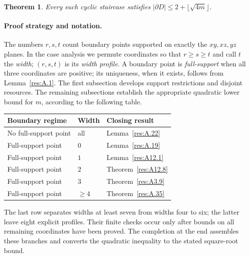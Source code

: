 \documentclass[11pt]{article}
\newtheorem{theorem}{Theorem}[section]
\theoremstyle{definition}
\theoremstyle{remark}
\theoremstyle{plain}
\begin{document}
\begin{theorem}\label{thm:capacity}
Every such cyclic staircase satisfies
$|\partial D|\le2+\lfloor\sqrt{4m}\rfloor$.
\end{theorem}


\paragraph{Proof strategy and notation.}
The numbers $r,s,t$ count boundary points supported on exactly the
$xy,xz,yz$ planes. In the case analysis we permute coordinates so that
$r\ge s\ge t$ and call $t$ the \emph{width}; $(r,s,t)$ is its
\emph{width profile}. A boundary point is
\emph{full-support} when all three coordinates are positive; its
uniqueness, when it exists, follows from Lemma~\ref{res:A.1}.
The first subsection develops support restrictions and disjoint
resources. The remaining subsections establish the appropriate quadratic
lower bound for $m$, according to the following table.
\begin{center}
\begin{tabular}{@{}lll@{}}\toprule
Boundary regime&Width&Closing result\\\midrule
No full-support point&all&Lemma~\ref{res:A.22}\\
Full-support point&$0$&Lemma~\ref{res:A.19}\\
Full-support point&$1$&Lemma~\ref{res:A12.1}\\
Full-support point&$2$&Theorem~\ref{res:A12.8}\\
Full-support point&$3$&Theorem~\ref{res:A3.9}\\
Full-support point&$\ge4$&Theorem~\ref{res:A.35}\\\bottomrule
\end{tabular}
\end{center}
The last row separates widths at least seven from widths four to six;
the latter leave eight explicit profiles. Their finite checks occur only
after bounds on all remaining coordinates have been proved.
The completion at the end assembles these branches and converts the
quadratic inequality to the stated square-root bound.
\end{document}

